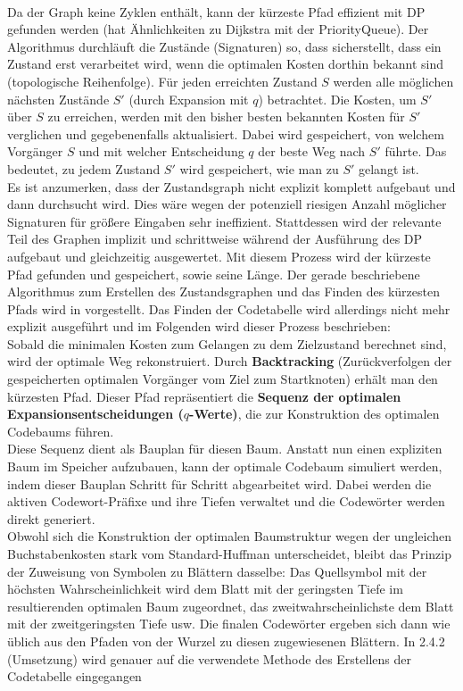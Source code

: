 \documentclass[a4paper,10pt,ngerman]{scrartcl}
\begin{document}
\\
\newline
Da der Graph keine Zyklen enthält, kann der kürzeste Pfad effizient mit DP gefunden werden (hat Ähnlichkeiten zu Dijkstra mit der PriorityQueue). Der Algorithmus durchläuft die Zustände (Signaturen) so, dass sicherstellt, dass ein Zustand erst verarbeitet wird, wenn die optimalen Kosten dorthin bekannt sind (topologische Reihenfolge). Für jeden erreichten Zustand $S$ werden alle möglichen nächsten Zustände $S'$ (durch Expansion mit $q$) betrachtet. Die Kosten, um $S'$ über $S$ zu erreichen, werden mit den bisher besten bekannten Kosten für $S'$ verglichen und gegebenenfalls aktualisiert. Dabei wird gespeichert, von welchem Vorgänger $S$ und mit welcher Entscheidung $q$ der beste Weg nach $S'$ führte. Das bedeutet, zu jedem Zustand $S'$ wird gespeichert, wie man zu $S'$ gelangt ist.  
\\
Es ist anzumerken, dass der Zustandsgraph nicht explizit komplett aufgebaut und dann durchsucht wird. Dies wäre wegen der potenziell riesigen Anzahl möglicher Signaturen für größere Eingaben sehr ineffizient. Stattdessen wird der relevante Teil des Graphen implizit und schrittweise während der Ausführung des DP aufgebaut und gleichzeitig ausgewertet. Mit diesem Prozess wird der kürzeste Pfad gefunden und gespeichert, sowie seine Länge. Der gerade beschriebene Algorithmus zum Erstellen des Zustandsgraphen und das Finden des kürzesten Pfads wird in \cite{papergolinrote} vorgestellt. Das Finden der Codetabelle wird allerdings nicht mehr explizit ausgeführt und im Folgenden wird dieser Prozess beschrieben:
\\\newline
Sobald die minimalen Kosten zum Gelangen zu dem Zielzustand berechnet sind, wird der optimale Weg rekonstruiert. Durch \textbf{Backtracking} (Zurückverfolgen der gespeicherten optimalen Vorgänger vom Ziel zum Startknoten) erhält man den kürzesten Pfad. Dieser Pfad repräsentiert die \textbf{Sequenz der optimalen Expansionsentscheidungen ($q$-Werte)}, die zur Konstruktion des optimalen Codebaums führen.
\\
Diese Sequenz dient als Bauplan für diesen Baum. Anstatt nun einen expliziten Baum im Speicher aufzubauen, kann der optimale Codebaum simuliert werden, indem dieser Bauplan Schritt für Schritt abgearbeitet wird. Dabei werden die aktiven Codewort-Präfixe und ihre Tiefen verwaltet und die Codewörter werden direkt generiert.
\\
Obwohl sich die Konstruktion der optimalen Baumstruktur wegen der ungleichen Buchstabenkosten stark vom Standard-Huffman unterscheidet, bleibt das Prinzip der Zuweisung von Symbolen zu Blättern dasselbe: Das Quellsymbol mit der höchsten Wahrscheinlichkeit wird dem Blatt mit der geringsten Tiefe im resultierenden optimalen Baum zugeordnet, das zweitwahrscheinlichste dem Blatt mit der zweitgeringsten Tiefe usw. Die finalen Codewörter ergeben sich dann wie üblich aus den Pfaden von der Wurzel zu diesen zugewiesenen Blättern. In 2.4.2 (Umsetzung) wird genauer auf die verwendete Methode des Erstellens der Codetabelle eingegangen
\end{document}
